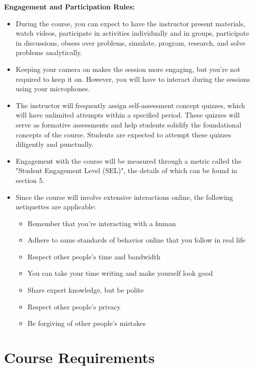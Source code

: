 \documentclass[a4paper,11pt]{article}
\begin{document}
\textbf{Engagement and Participation Rules:} 
\begin{itemize}	
	\item During the course, you can expect to have the instructor present materials, watch videos, participate in activities individually and in groups, participate in discussions, obsess over problems, simulate, program, research, and solve problems analytically. 
	\item Keeping your camera on makes the session more engaging, but you're not required to keep it on. However, you will have to interact during the sessions using your microphones.
	\item The instructor will frequently assign self-assessment concept quizzes, which will have unlimited attempts within a specified period. These quizzes will serve as formative assessments and help students solidify the foundational concepts of the course. Students are expected to attempt these quizzes diligently and punctually.
	\item Engagement with the course will be measured through a metric called the "Student Engagement Level (SEL)", the details of which can be found in section 5.	
	\item Since the course will involve extensive interactions online, the following netiquettes are applicable:
	\begin{itemize}
	 	\item Remember that you're interacting with a human
	 	\item Adhere to same standards of behavior online that you follow in real life
	 	\item Respect other people's time and bandwidth
	 	\item You can take your time writing and make yourself look good
	 	\item Share expert knowledge, but be polite
	 	\item Respect other people's privacy
	 	\item Be forgiving of other people's mistakes
	 \end{itemize} 
\end{itemize}



\section{Course Requirements}
\end{document}
